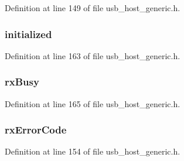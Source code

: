 Definition at line 149 of file usb\+\_\+host\+\_\+generic.\+h.

\hypertarget{struct___g_e_n_e_r_i_c___d_e_v_i_c_e_ad6fb88f612f59711845df5b602166e22}{}
\subsubsection[{initialized}]{ initialized}\label{struct___g_e_n_e_r_i_c___d_e_v_i_c_e_ad6fb88f612f59711845df5b602166e22}


Definition at line 163 of file usb\+\_\+host\+\_\+generic.\+h.

\hypertarget{struct___g_e_n_e_r_i_c___d_e_v_i_c_e_a6eac90a1f917c591e0be140e1303a5c9}{}
\subsubsection[{rx\+Busy}]{ rx\+Busy}\label{struct___g_e_n_e_r_i_c___d_e_v_i_c_e_a6eac90a1f917c591e0be140e1303a5c9}


Definition at line 165 of file usb\+\_\+host\+\_\+generic.\+h.

\hypertarget{struct___g_e_n_e_r_i_c___d_e_v_i_c_e_a903f6f6b3dda551cad06a5fcad7db43c}{}
\subsubsection[{rx\+Error\+Code}]{ rx\+Error\+Code}\label{struct___g_e_n_e_r_i_c___d_e_v_i_c_e_a903f6f6b3dda551cad06a5fcad7db43c}


Definition at line 154 of file usb\+\_\+host\+\_\+generic.\+h.

